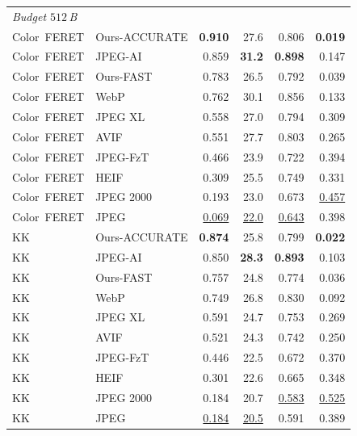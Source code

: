 \begin{tabular}{llrrrr}
\midrule
\multicolumn{6}{l}{\emph{Budget $512$\,B}}\\
Color~FERET & Ours-ACCURATE & \cellcolor{green!25}\textbf{0.910} & 27.6 & 0.806 & \cellcolor{green!25}\textbf{0.019} \\
Color~FERET & JPEG-AI & 0.859 & \cellcolor{green!25}\textbf{31.2} & \cellcolor{green!25}\textbf{0.898} & 0.147 \\
Color~FERET & Ours-FAST & 0.783 & 26.5 & 0.792 & 0.039 \\
Color~FERET & WebP & 0.762 & 30.1 & 0.856 & 0.133 \\
Color~FERET & JPEG XL & 0.558 & 27.0 & 0.794 & 0.309 \\
Color~FERET & AVIF & 0.551 & 27.7 & 0.803 & 0.265 \\
Color~FERET & JPEG-FzT & 0.466 & 23.9 & 0.722 & 0.394 \\
Color~FERET & HEIF & 0.309 & 25.5 & 0.749 & 0.331 \\
Color~FERET & JPEG 2000 & 0.193 & 23.0 & 0.673 & \cellcolor{red!22}\underline{0.457} \\
Color~FERET & JPEG & \cellcolor{red!22}\underline{0.069} & \cellcolor{red!22}\underline{22.0} & \cellcolor{red!22}\underline{0.643} & 0.398 \\
KK & Ours-ACCURATE & \cellcolor{green!25}\textbf{0.874} & 25.8 & 0.799 & \cellcolor{green!25}\textbf{0.022} \\
KK & JPEG-AI & 0.850 & \cellcolor{green!25}\textbf{28.3} & \cellcolor{green!25}\textbf{0.893} & 0.103 \\
KK & Ours-FAST & 0.757 & 24.8 & 0.774 & 0.036 \\
KK & WebP & 0.749 & 26.8 & 0.830 & 0.092 \\
KK & JPEG XL & 0.591 & 24.7 & 0.753 & 0.269 \\
KK & AVIF & 0.521 & 24.3 & 0.742 & 0.250 \\
KK & JPEG-FzT & 0.446 & 22.5 & 0.672 & 0.370 \\
KK & HEIF & 0.301 & 22.6 & 0.665 & 0.348 \\
KK & JPEG 2000 & 0.184 & 20.7 & \cellcolor{red!22}\underline{0.583} & \cellcolor{red!22}\underline{0.525} \\
KK & JPEG & \cellcolor{red!22}\underline{0.184} & \cellcolor{red!22}\underline{20.5} & 0.591 & 0.389 \\
\bottomrule
\end{tabular}
